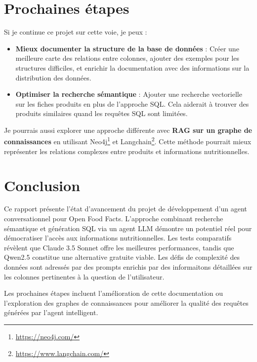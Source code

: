 \documentclass[a4paper,11pt]{article}
\begin{document}
\section{Prochaines étapes}
\label{sec:next}

Si je continue ce projet sur cette voie, je peux :
\begin{itemize}
\item \textbf{Mieux documenter la structure de la base de données} : Créer une meilleure carte des relations entre colonnes, ajouter des exemples pour les structures difficiles, et enrichir la documentation avec des informations sur la distribution des données.
\item \textbf{Optimiser la recherche sémantique} : Ajouter une recherche vectorielle sur les fiches produits en plus de l'approche SQL. Cela aiderait à trouver des produits similaires quand les requêtes SQL sont limitées.
\end{itemize}

\vskip 0.1cm
Je pourrais aussi explorer une approche différente avec \textbf{RAG sur un graphe de connaissances} en utilisant Neo4j\footnote{\url{https://neo4j.com/}} et 
Langchain\footnote{\url{https://www.langchain.com/}}. Cette méthode pourrait mieux représenter les relations complexes entre produits et informations nutritionnelles.


\section{Conclusion}
\label{sec:conclusion}

Ce rapport présente l'état d'avancement du projet de développement d'un agent conversationnel pour Open Food Facts. L'approche combinant recherche sémantique et génération SQL via un agent LLM démontre un potentiel réel pour démocratiser l'accès aux informations nutritionnelles. Les tests comparatifs révèlent que Claude 3.5 Sonnet offre les meilleures performances, tandis que Qwen2.5 constitue une alternative gratuite viable. Les défis de complexité des données sont adressés par des prompts enrichis 
par des informaitons détaillées sur les colonnes pertinentes à la question de l'utilisateur.

Les prochaines étapes incluent l'amélioration de cette documentation ou l'exploration des graphes de connaissances pour améliorer la qualité des requêtes générées par l'agent intelligent.
\end{document}
